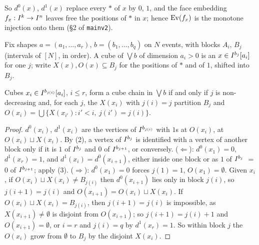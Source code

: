 \documentclass[11pt]{article}
\begin{document}
So $d^0(x)$, $d^1(x)$ replace every $*$ of $x$ by $0$, $1$, and the face embedding $f_x :
I^{k} \to I^{n}$ leaves free the positions of $*$ in $x$; hence $\operatorname{Ev}(f_x)$ is the monotone
injection onto them (\S2 of \texttt{mainv2}).

Fix shapes $a = (a_1,\dots,a_r)$, $b = (b_1,\dots,b_q)$ on $N$ events, with blocks $A_i$, $B_j$
(intervals of $[N]$, in order). A cube of $\bigvee b$ of dimension $a_i > 0$ is an $x \in
I^{b_j}[a_i]$ for one $j$; write $X(x), O(x) \subseteq B_j$ for the positions of $*$ and of
$1$, shifted into $B_j$.

\begin{lemma}\label{lem:chains}
  Cubes $x_i \in I^{b_{j(i)}}[a_i]$, $i \le r$, form a cube chain in $\bigvee b$ if and only if
  $j$ is non-decreasing and, for each $j$, the $X(x_i)$ with $j(i) = j$ partition $B_j$ and $O(x_i)
  = \bigcup\{X(x_{i'}) : i' < i,\ j(i') = j(i)\}$.
\end{lemma}
\begin{proof}
  $d^0(x_i)$, $d^1(x_i)$ are the vertices of $I^{b_{j(i)}}$ with $1$s at $O(x_i)$, at
  $O(x_i) \sqcup X(x_i)$. By (2), a vertex of $I^{b_j}$ is identified with a
  vertex of another block only if it is $1$ of $I^{b_j}$ and $0$ of $I^{b_{j+1}}$, or
  conversely. ($\Leftarrow$): $d^0(x_1) = 0$, $d^1(x_r) = 1$, and
  $d^1(x_i) = d^0(x_{i+1})$, either inside one block or as $1$ of $I^{b_j}$ $=$ $0$ of
  $I^{b_{j+1}}$; apply (3). ($\Rightarrow$):
  $d^0(x_1) = 0$ forces $j(1) = 1$, $O(x_1) = \emptyset$. Given $x_i$, if $O(x_i) \sqcup X(x_i) \neq
  B_{j(i)}$ then $d^0(x_{i+1})$ lies only in block $j(i)$, so $j(i+1) = j(i)$ and $O(x_{i+1}) =
  O(x_i) \sqcup X(x_i)$. If $O(x_i) \sqcup X(x_i) = B_{j(i)}$, then $j(i+1) = j(i)$ is impossible,
  as $X(x_{i+1}) \neq \emptyset$ is disjoint from $O(x_{i+1})$; so $j(i+1) = j(i)+1$ and
  $O(x_{i+1}) = \emptyset$, or $i = r$ and $j(i) = q$ by $d^1(x_r) = 1$. So within block $j$ the $O(x_i)$ grow from
  $\emptyset$ to $B_j$ by the disjoint $X(x_i)$.
\end{proof}
\end{document}
